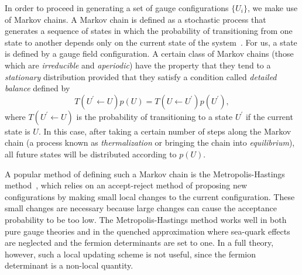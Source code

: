 In order to proceed in generating a set of gauge configurations $\{U_i\}$, we make use of Markov chains. A Markov chain is defined as a stochastic process that generates a sequence of states in which the probability of transitioning from one state to another depends only on the current state of the system~\cite{Morningstar:2007zm}. For us, a state is defined by a gauge field configuration. A certain class of Markov chains (those which are \emph{irreducible} and \emph{aperiodic}) have the property that they tend to a \emph{stationary} distribution provided that they satisfy a condition called \emph{detailed balance} defined by
\begin{equation}
    T(U^\prime \leftarrow U)p(U) = T(U \leftarrow U^\prime)p(U^\prime),
\end{equation}
where $T(U^\prime \leftarrow U)$ is the probability of transitioning to a state $U^\prime$ if the current state is $U$. In this case, after taking a certain number of steps along the Markov chain (a process known as \emph{thermalization} or bringing the chain into \emph{equilibrium}), all future states will be distributed according to $p(U)$.

A popular method of defining such a Markov chain is the Metropolis-Hastings method~\cite{Metropolis:1953am}, which relies on an accept-reject method of proposing new configurations by making small local changes to the current configuration. These small changes are necessary because large changes can cause the acceptance probability to be too low. The Metropolis-Hastings method works well in both pure gauge theories and in the quenched approximation where sea-quark effects are neglected and the fermion determinants are set to one. In a full theory, however, such a local updating scheme is not useful, since the fermion determinant is a non-local quantity.
